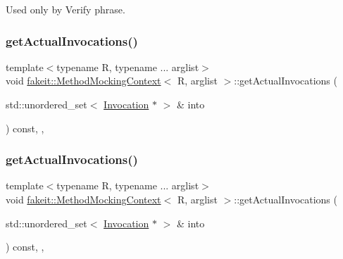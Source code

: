Used only by Verify phrase. 

\mbox{\label{classfakeit_1_1MethodMockingContext_ad6803405abfd419799882f837d6f56b6}} 
\subsubsection{\texorpdfstring{getActualInvocations()}{getActualInvocations()}\hspace{0.1cm}{\footnotesize\ttfamily [2/9]}}
{\footnotesize\ttfamily template$<$typename R, typename ... arglist$>$ \\
void \mbox{\hyperlink{classfakeit_1_1MethodMockingContext}{fakeit\+::\+Method\+Mocking\+Context}}$<$ R, arglist $>$\+::get\+Actual\+Invocations (\begin{DoxyParamCaption}\item[{std\+::unordered\+\_\+set$<$ \mbox{\hyperlink{structfakeit_1_1Invocation}{Invocation}} $\ast$ $>$ \&}]{into }\end{DoxyParamCaption}) const\hspace{0.3cm}{\ttfamily [inline]}, {\ttfamily [override]}, {\ttfamily [protected]}}

\mbox{\label{classfakeit_1_1MethodMockingContext_ad6803405abfd419799882f837d6f56b6}} 
\subsubsection{\texorpdfstring{getActualInvocations()}{getActualInvocations()}\hspace{0.1cm}{\footnotesize\ttfamily [3/9]}}
{\footnotesize\ttfamily template$<$typename R, typename ... arglist$>$ \\
void \mbox{\hyperlink{classfakeit_1_1MethodMockingContext}{fakeit\+::\+Method\+Mocking\+Context}}$<$ R, arglist $>$\+::get\+Actual\+Invocations (\begin{DoxyParamCaption}\item[{std\+::unordered\+\_\+set$<$ \mbox{\hyperlink{structfakeit_1_1Invocation}{Invocation}} $\ast$ $>$ \&}]{into }\end{DoxyParamCaption}) const\hspace{0.3cm}{\ttfamily [inline]}, {\ttfamily [override]}, {\ttfamily [protected]}}

